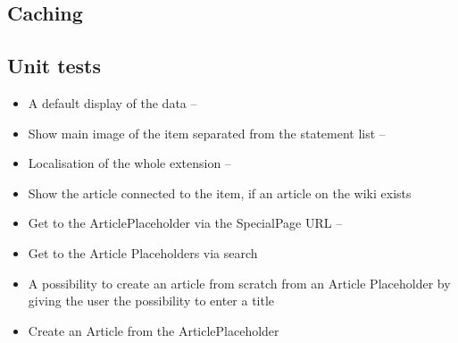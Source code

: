 \documentclass[11pt]{article}
\begin{document}
\subsection{Caching}



\subsection {Unit tests}



\begin{itemize}
\item A default display of the data -- 
\item Show main image of the item separated from the statement list -- 
\item Localisation of the whole extension -- 
\item Show the article connected to the item, if an article on the wiki exists
\item Get to the ArticlePlaceholder via the SpecialPage URL --
\item Get to the Article Placeholders via search
\item A possibility to create an article from scratch from an Article Placeholder by giving the user the possibility to enter a title

\item Create an Article from the ArticlePlaceholder
\end{itemize} 

\newpage
 

\end{document}
